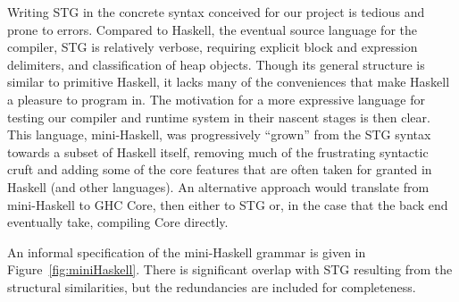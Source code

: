 \documentclass{llncs}
\begin{document}
Writing STG in the concrete syntax conceived for our project is tedious and
prone to errors.  Compared to Haskell, the eventual source language for the
compiler, STG is relatively verbose, requiring explicit block and expression
delimiters, and classification of heap objects. Though its general structure
is similar to primitive Haskell, it lacks many of the conveniences that make
Haskell a pleasure to program in.  The motivation for a more expressive
language for testing our compiler and runtime system in their nascent stages
is then clear.  This language, mini-Haskell, was progressively ``grown'' from
the STG syntax towards a subset of Haskell itself, removing much of the
frustrating syntactic cruft and adding some of the core features that are
often taken for granted in Haskell (and other languages).  An alternative
approach would translate from mini-Haskell to GHC Core, then either to STG or,
in the case that the back end eventually take, compiling Core directly.

An informal specification of the mini-Haskell grammar is given in
Figure~\ref{fig:miniHaskell}.  There is significant overlap with STG resulting
from the structural similarities, but the redundancies are included for
completeness.





\newcommand{\hash}{{\scriptsize\#}}
\end{document}
